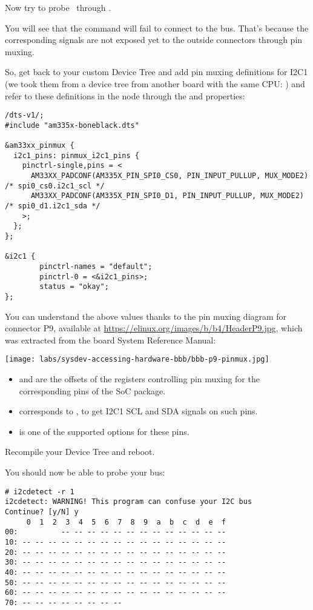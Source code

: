 {Now try to probe \busname\  through .

You will see that the command will fail to connect to
the bus. That's because the corresponding signals are
not exposed yet to the outside connectors through pin muxing.

So, get back to your custom Device Tree and add pin muxing definitions
for I2C1 (we took them from a device tree from another board with the same
CPU: ) and refer to these
definitions in the  node through the 
and  properties:

\begin{verbatim}
/dts-v1/;
#include "am335x-boneblack.dts"

&am33xx_pinmux {
  i2c1_pins: pinmux_i2c1_pins {
    pinctrl-single,pins = <
      AM33XX_PADCONF(AM335X_PIN_SPI0_CS0, PIN_INPUT_PULLUP, MUX_MODE2) /* spi0_cs0.i2c1_scl */
      AM33XX_PADCONF(AM335X_PIN_SPI0_D1, PIN_INPUT_PULLUP, MUX_MODE2) /* spi0_d1.i2c1_sda */
    >;
  };
};

&i2c1 {
        pinctrl-names = "default";
        pinctrl-0 = <&i2c1_pins>;
        status = "okay";
};
\end{verbatim}

You can understand the above values thanks to the pin muxing diagram for
connector P9, available at \url{https://elinux.org/images/b/b4/HeaderP9.jpg},
which was extracted from the board System Reference Manual:

\texttt{[image: labs/sysdev-accessing-hardware-bbb/bbb-p9-pinmux.jpg]}

\begin{itemize}
  \item {} and  are
        the offsets of the registers controlling pin muxing for the
	corresponding pins of the SoC package.
  \item {} corresponds to , to get I2C1 SCL and SDA
	signals on such pins.
  \item {} is one of the supported options for
        these pins.
\end{itemize}

Recompile your Device Tree and reboot.

You should now be able to probe your bus:

\begin{verbatim}
# i2cdetect -r 1
i2cdetect: WARNING! This program can confuse your I2C bus
Continue? [y/N] y
     0  1  2  3  4  5  6  7  8  9  a  b  c  d  e  f
00:          -- -- -- -- -- -- -- -- -- -- -- -- --
10: -- -- -- -- -- -- -- -- -- -- -- -- -- -- -- --
20: -- -- -- -- -- -- -- -- -- -- -- -- -- -- -- --
30: -- -- -- -- -- -- -- -- -- -- -- -- -- -- -- --
40: -- -- -- -- -- -- -- -- -- -- -- -- -- -- -- --
50: -- -- -- -- -- -- -- -- -- -- -- -- -- -- -- --
60: -- -- -- -- -- -- -- -- -- -- -- -- -- -- -- --
70: -- -- -- -- -- -- -- --
\end{verbatim}

}
